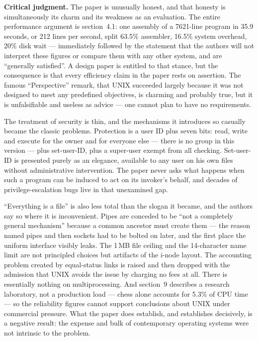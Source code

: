 \textbf{Critical judgment.}
The paper is unusually honest, and that honesty is simultaneously its charm and its weakness
as an evaluation. The entire performance argument is section~4.1: one assembly of a
7621-line program in 35.9 seconds, or 212 lines per second, split 63.5\% assembler, 16.5\%
system overhead, 20\% disk wait --- immediately followed by the statement that the authors
will not interpret these figures or compare them with any other system, and are ``generally
satisfied''. A design paper is entitled to that stance, but the consequence is that every
efficiency claim in the paper rests on assertion. The famous ``Perspective'' remark, that
UNIX succeeded largely because it was not designed to meet any predefined objectives, is
charming and probably true, but it is unfalsifiable and useless as advice --- one cannot
plan to have no requirements.

The treatment of security is thin, and the mechanisms it introduces so casually became the
classic problems. Protection is a user ID plus seven bits: read, write and execute for the
owner and for everyone else --- there is no group in this version --- plus set-user-ID, plus
a super-user exempt from all checking. Set-user-ID is presented purely as an elegance,
available to any user on his own files without administrative intervention. The paper never
asks what happens when such a program can be induced to act on its invoker's behalf, and
decades of privilege-escalation bugs live in that unexamined gap.

``Everything is a file'' is also less total than the slogan it became, and the authors say so
where it is inconvenient. Pipes are conceded to be ``not a completely general mechanism''
because a common ancestor must create them --- the reason named pipes and then sockets had
to be bolted on later, and the first place the uniform interface visibly leaks. The 1\,MB
file ceiling and the 14-character name limit are not principled choices but artifacts of the
i-node layout. The accounting problem created by equal-status links is raised and then
dropped with the admission that UNIX avoids the issue by charging no fees at all. There is
essentially nothing on multiprocessing. And section~9 describes a research laboratory, not a
production load --- chess alone accounts for 5.3\% of CPU time --- so the reliability figures
cannot support conclusions about UNIX under commercial pressure. What the paper does
establish, and establishes decisively, is a negative result: the expense and bulk of
contemporary operating systems were not intrinsic to the problem.

